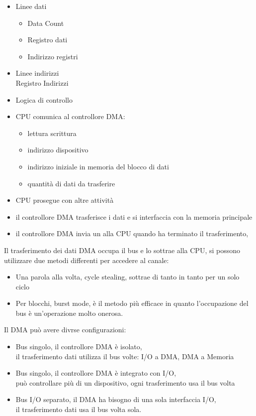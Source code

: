 \documentclass[arch.tex]{subfiles}
\begin{document}
\begin{itemize}
	\item Linee dati
		\begin{itemize}
			\item Data Count
			\item Registro dati
			\item Indirizzo registri
		\end{itemize}
	\item Linee indirizzi\\
		Registro Indirizzi
	\item Logica di controllo
\end{itemize}

%
\label{ppar:Operazioni DMA}
	

\begin{itemize}
	\item CPU comunica al controllore DMA:

		\begin{itemize}
			\item lettura scrittura
			\item indirizzo dispositivo
			\item indirizzo iniziale in memoria del blocco di dati
			\item quantità di dati da trasferire
		\end{itemize}
	\item CPU prosegue con altre attività
	\item il controllore DMA trasferisce i dati e si interfaccia con la memoria principale
	\item il controllore DMA invia un  alla CPU quando ha terminato
		il trasferimento,
\end{itemize}
Il trasferimento dei dati DMA occupa il bus e lo sottrae alla CPU, si possono
utilizzare due metodi differenti per accedere al canale:

\begin{itemize}
	\item Una parola alla volta, cycle stealing, sottrae di tanto in tanto
		per un solo ciclo
	\item Per blocchi, burst mode, è il metodo più efficace in quanto 
		l'occupazione del bus è un'operazione molto onerosa.
\end{itemize}
Il DMA può avere divrse configurazioni:

\begin{itemize}
	\item Bus singolo, il controllore DMA è isolato,\\
		il trasferimento dati utilizza il bus  volte: I/O a DMA, DMA a 
		Memoria
	\item Bus singolo, il controllore DMA è integrato con I/O,\\
		può controllare più di un dispositivo, ogni trasferimento usa il bus
		 volta
	\item Bus I/O separato, il DMA ha bisogno di una sola interfaccia I/O,\\
		il trasferimento dati usa il bus  volta sola.
\end{itemize}
\end{document}
